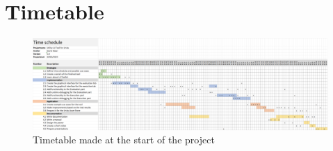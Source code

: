 \chapter{Timetable}
\label{chap:appendix_timetable}
\newpage

\begin{figure}[H]
	\centering
		\includegraphics[scale=0.28, angle=90]{images/timetable.png}
	\caption{Timetable made at the start of the project}
	\label{fig:timetable}
\end{figure}
